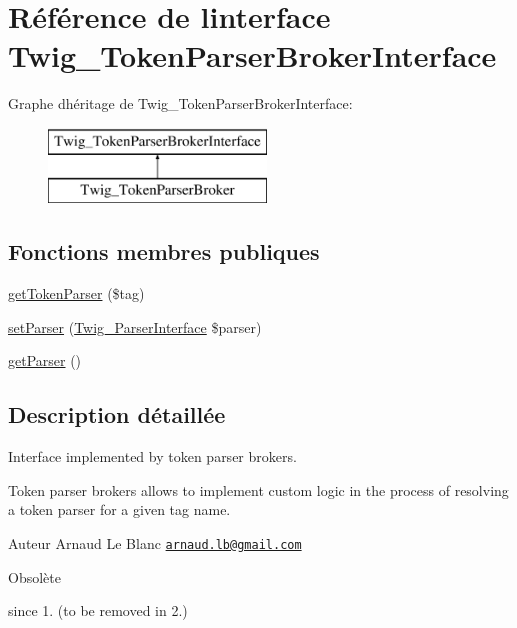 \hypertarget{interface_twig___token_parser_broker_interface}{}\section{Référence de l\textquotesingle{}interface Twig\+\_\+\+Token\+Parser\+Broker\+Interface}
\label{interface_twig___token_parser_broker_interface}
Graphe d\textquotesingle{}héritage de Twig\+\_\+\+Token\+Parser\+Broker\+Interface\+:\begin{figure}[H]
\begin{center}
\leavevmode
\includegraphics[height=2.000000cm]{interface_twig___token_parser_broker_interface}
\end{center}
\end{figure}
\subsection*{Fonctions membres publiques}
\begin{DoxyCompactItemize}
\item 
\hyperlink{interface_twig___token_parser_broker_interface_adff2d8a3b28dce12e0bccd335af4012f}{get\+Token\+Parser} (\$tag)
\item 
\hyperlink{interface_twig___token_parser_broker_interface_ac16cd9a5f9db326226c01aa3ee943857}{set\+Parser} (\hyperlink{interface_twig___parser_interface}{Twig\+\_\+\+Parser\+Interface} \$parser)
\item 
\hyperlink{interface_twig___token_parser_broker_interface_a4b6907ea868dc9053e1f7d6260fa4b4f}{get\+Parser} ()
\end{DoxyCompactItemize}


\subsection{Description détaillée}
Interface implemented by token parser brokers.

Token parser brokers allows to implement custom logic in the process of resolving a token parser for a given tag name.

\begin{DoxyAuthor}{Auteur}
Arnaud Le Blanc \href{mailto:arnaud.lb@gmail.com}{\tt arnaud.\+lb@gmail.\+com}
\end{DoxyAuthor}
\begin{DoxyRefDesc}{Obsolète}
\item[\hyperlink{deprecated__deprecated000044}{Obsolète}]since 1. (to be removed in 2.) \end{DoxyRefDesc}


